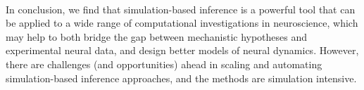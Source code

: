 \\
\indent In conclusion, we find that simulation-based inference is a powerful tool that can be applied to a wide range of computational investigations in neuroscience, which may help to both bridge the gap between mechanistic hypotheses and experimental neural data, and design better models of neural dynamics. However, there are challenges (and opportunities) ahead in scaling and automating simulation-based inference approaches, and the methods are simulation intensive. 
